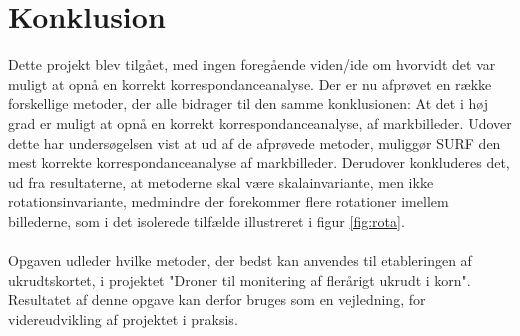 \chapter{Konklusion}
Dette projekt blev tilgået, med ingen foregående viden/ide om hvorvidt det var muligt at opnå en korrekt korrespondanceanalyse. Der er nu afprøvet en række forskellige metoder, der alle bidrager til den samme konklusionen: At det i høj grad er muligt at opnå en korrekt korrespondanceanalyse, af markbilleder. Udover dette har undersøgelsen vist at ud af de afprøvede metoder, muliggør SURF den mest korrekte korrespondanceanalyse af markbilleder. 
Derudover konkluderes det, ud fra resultaterne, at metoderne skal være skalainvariante, men ikke rotationsinvariante, medmindre der forekommer flere rotationer imellem billederne, som i det isolerede tilfælde illustreret i figur \ref{fig:rota}.  \\ \\
Opgaven udleder hvilke metoder, der bedst kan anvendes til etableringen af ukrudtskortet, i projektet "Droner til monitering af flerårigt ukrudt i korn". Resultatet af denne opgave kan derfor bruges som en vejledning, for videreudvikling af projektet i praksis. 





